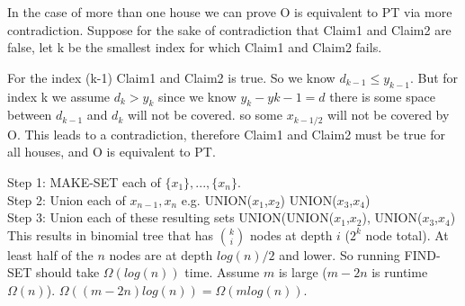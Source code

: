 \documentclass[12pt]{article}
\newenvironment{question}[2][Question]{\begin{trivlist}
		\item[\hskip \labelsep {\bfseries #1}\hskip \labelsep {\bfseries #2.}]}{\end{trivlist}}
\begin{document}
\begin{question}{4}
In the case of more than one house we can prove O is equivalent to PT via more contradiction.
Suppose for the sake of contradiction that Claim1 and Claim2 are false, let k be the smallest index for which Claim1 and Claim2 fails. 

For the index (k-1) Claim1 and Claim2 is true. So we know $d_{k-1} \leq y_{k-1}$. 
But for index k we assume $d_k > y_k$ since we know $y_k - y{k-1} = d$ there is some space between $d_{k-1}$ and $d_k$ will not be covered. so some $x_{k-1/2}$ will not be covered by O.
This leads to a contradiction, therefore Claim1 and Claim2 must be true for all houses, and O is equivalent to PT.


		
	\end{question}

	\begin{question}{5}
		
		Step 1: MAKE-SET each of $\{x_1\},..., \{x_n\}$.\\
		Step 2: Union each of $x_{n-1}, x_n$ e.g. UNION($x_1$,$x_2$) UNION($x_3$,$x_4$)\\
		Step 3: Union each of these resulting sets  UNION(UNION($x_1$,$x_2$), UNION($x_3$,$x_4$)\\
		This results in binomial tree that has ${k \choose i}$ nodes at depth $i$ ($2^k$ node total). At least half of the $n$ nodes are at depth $log(n)/2$ and lower. 
		So running FIND-SET should take $\Omega(log(n))$ time. Assume $m$ is large ($m-2n$ is runtime $\Omega(n)$). $\Omega((m-2n)log(n)) = \Omega(mlog(n))$.
	\end{question}
	\clearpage
	
	
	
\end{document}
